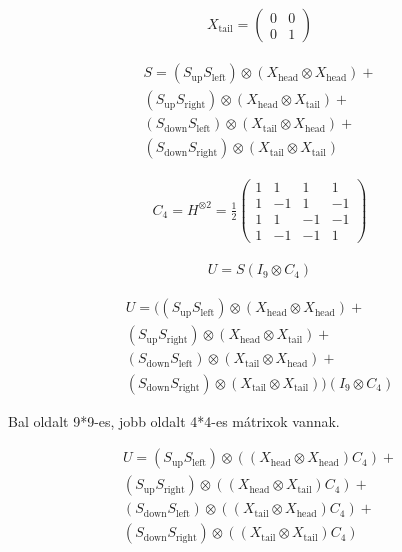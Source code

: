 \begin{align}
  X_{\text{tail}} =
  \begin{pmatrix}
    0 & 0 \\
    0 & 1
  \end{pmatrix}
\end{align}


\begin{align}
  S =
  (S_{\text{up}} S_{\text{left}}) \otimes (X_{\text{head}} \otimes X_{\text{head}}) +    \\
  (S_{\text{up}}  S_{\text{right}}) \otimes (X_{\text{head}} \otimes X_{\text{tail}}) +  \\
  (S_{\text{down}}  S_{\text{left}}) \otimes (X_{\text{tail}} \otimes X_{\text{head}}) + \\
  (S_{\text{down}} S_{\text{right}}) \otimes (X_{\text{tail}} \otimes X_{\text{tail}})
\end{align}

\begin{align}
  C_4 = H^{\otimes2} = \frac{1}{2}
  \begin{pmatrix}
    1 & 1  & 1  & 1  \\
    1 & -1 & 1  & -1 \\
    1 & 1  & -1 & -1 \\
    1 & -1 & -1 & 1
  \end{pmatrix}
\end{align}

\begin{align}
  U = S  (I_9 \otimes C_4)
\end{align}

\begin{align}
  U =
  ((S_{\text{up}}  S_{\text{left}}) \otimes (X_{\text{head}} \otimes X_{\text{head}}) +  \\
  (S_{\text{up}} S_{\text{right}}) \otimes (X_{\text{head}} \otimes X_{\text{tail}}) +   \\
  (S_{\text{down}}  S_{\text{left}}) \otimes (X_{\text{tail}} \otimes X_{\text{head}}) + \\
  (S_{\text{down}} S_{\text{right}}) \otimes (X_{\text{tail}} \otimes X_{\text{tail}}))
  (I_9 \otimes C_4)
\end{align}


Bal oldalt 9*9-es, jobb oldalt 4*4-es mátrixok vannak.

\begin{align}
  U =
  (S_{\text{up}}  S_{\text{left}}) \otimes ((X_{\text{head}} \otimes X_{\text{head}})  C_4) +   \\
  (S_{\text{up}}  S_{\text{right}}) \otimes ((X_{\text{head}} \otimes X_{\text{tail}}) C_4) +   \\
  (S_{\text{down}}  S_{\text{left}}) \otimes ((X_{\text{tail}} \otimes X_{\text{head}})  C_4) + \\
  (S_{\text{down}}  S_{\text{right}}) \otimes ((X_{\text{tail}} \otimes X_{\text{tail}}) C_4)
\end{align}

